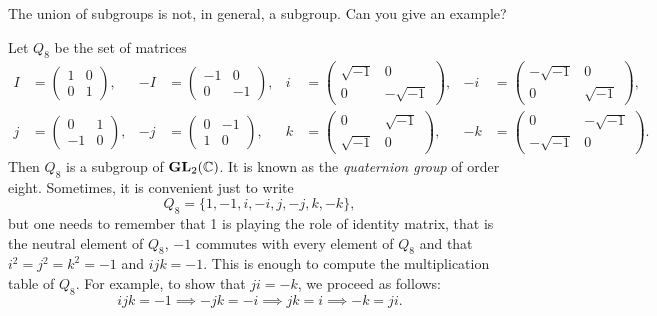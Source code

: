 \begin{exercise}
\label{xca:union}
        The union of subgroups is not, in general, 
        a subgroup. Can you give an example? 
\end{exercise}

\begin{example}
    Let $Q_8$ be the set of matrices 
    \begin{align*}
        I&=\begin{pmatrix}
            1&0\\
            0&1
        \end{pmatrix},
        &
        -I&=\begin{pmatrix}
            -1&0\\
            0&-1
        \end{pmatrix},
        &
        i&=\begin{pmatrix}
            \sqrt{-1}&0\\
            0&-\sqrt{-1}
        \end{pmatrix},
        &
        -i&=\begin{pmatrix}
            -\sqrt{-1}&0\\
            0&\sqrt{-1}
        \end{pmatrix},\\
        j&=\begin{pmatrix}
            0&1\\
            -1&0
        \end{pmatrix},
        &
        -j&=\begin{pmatrix}
            0&-1\\
            1&0
        \end{pmatrix},
        &
        k&=\begin{pmatrix}
            0&\sqrt{-1}\\
            \sqrt{-1}&0
        \end{pmatrix},
        &
        -k &=\begin{pmatrix}
            0&-\sqrt{-1}\\
            -\sqrt{-1}&0
        \end{pmatrix}.
    \end{align*}
    Then $Q_8$ is a subgroup of $\mathbf{GL}_2(\mathbb{C})$. It is known as the \emph{quaternion group} of order eight. Sometimes, it is convenient just to write
    \[
    Q_8=\{1,-1,i,-i,j,-j,k,-k\}, 
    \]
    but one needs to remember 
    that 1 is playing the role of identity matrix, that is the neutral element of $Q_8$, 
    $-1$ commutes with every element of $Q_8$ 
    and that $i^2=j^2=k^2=-1$ and $ijk=-1$. This is enough to compute the multiplication table
    of $Q_8$. For example, to show that $ji=-k$, we proceed as follows: 
    \[
    ijk=-1\implies -jk=-i\implies jk=i\implies -k=ji.
    \]
\end{example}

